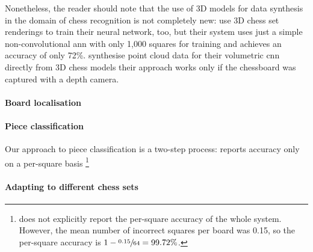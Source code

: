 \documentclass[../main.tex]{subfiles}
\begin{document}
Nonetheless, the reader should note that the use of 3D models for data synthesis in the domain of chess recognition is not completely new:
\textcite{hou} use 3D chess set renderings to train their neural network, too, but their system uses just a simple non-convolutional \gls{ann} with only 1,000 squares for training and achieves an accuracy of only 72\%.
\textcite{wei2017} synthesise point cloud data for their volumetric \gls{cnn} directly from 3D chess models their approach works only if the chessboard was captured with a depth camera.

\paragraph{Board localisation}
\paragraph{Piece classification}
Our approach to piece classification is a two-step process:
\cite{mehta2020} reports accuracy only on a per-square basis
\footnote{
     does not explicitly report the per-square accuracy of the whole system.
    However, the mean number of incorrect squares per board was 0.15, so the per-square accuracy is $1-\sfrac{0.15}{64}=99.72\%$.
}

\paragraph{Adapting to different chess sets}

\ifSubfilesClassLoaded{%
\printglossary[type=\acronymtype]%
\printbibliography%
}{}%
\end{document}
